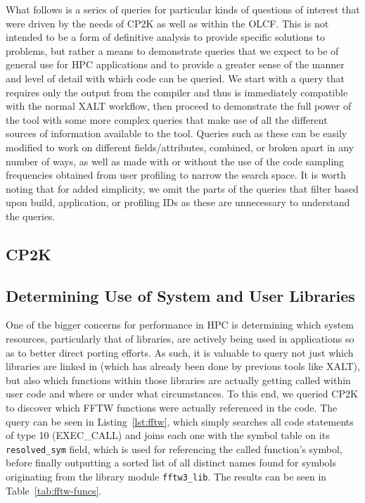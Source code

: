 What follows is a series of queries for particular kinds of questions of interest that were driven by the needs of CP2K as well as within the \acs{OLCF}.
This is not intended to be a form of definitive analysis to provide specific solutions to problems, but rather a means to demonstrate queries that we expect to be of general use for \acs{HPC} applications and to provide a greater sense of the manner and level of detail with which code can be queried.
We start with a query that requires only the output from the compiler and thus is immediately compatible with the normal XALT workflow, then proceed to demonstrate the full power of the tool with some more complex queries that make use of all the different sources of information available to the tool.
Queries such as these can be easily modified to work on different fields/attributes, combined, or broken apart in any number of ways, as well as made with or without the use of the code sampling frequencies obtained from user profiling to narrow the search space.
It is worth noting that for added simplicity, we omit the parts of the queries that filter based upon build, application, or profiling IDs as these are unnecessary to understand the queries.

\subsection{CP2K}
\label{sec:cp2k}


\subsection{Determining Use of System and User Libraries}
One of the bigger concerns for performance in \acs{HPC} is determining which system resources, particularly that of libraries, are actively being used in applications so as to better direct porting efforts.
As such, it is valuable to query not just which libraries are linked in (which has already been done by previous tools like XALT), but also which functions within those libraries are actually getting called within user code and where or under what circumstances.
To this end, we queried CP2K to discover which \ac{FFTW} functions were actually referenced in the code.
The query can be seen in Listing~\ref{lst:fftw}, which simply searches all code statements of type 10 (EXEC\_CALL) and joins each one with the symbol table on its \texttt{resolved\_sym} field, which is used for referencing the called function's symbol, before finally outputting a sorted list of all distinct names found for symbols originating from the library module \texttt{fftw3\_lib}.
The results can be seen in Table~\ref{tab:fftw-funcs}.

